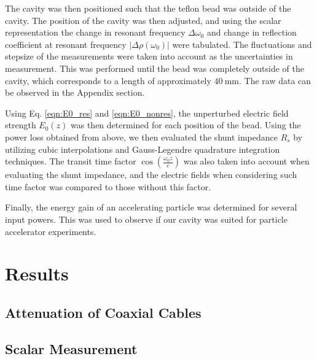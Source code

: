 \documentclass[a4paper]{article}
\numberwithin{equation}{section}
\begin{document}
The cavity was then positioned such that the teflon bead was outside of the
cavity. The position of the cavity was then adjusted, and using the scalar
representation the change in resonant frequency $\Delta\omega_0$ and change in
reflection coefficient at resonant frequency $|\Delta\rho(\omega_0)|$ were
tabulated. The fluctuations and stepsize of the measurements were taken into
account as the uncertainties in measurement. This was performed until the bead
was completely outside of the cavity, which corresponds to a length of
approximately $\SI{40}{\milli\metre}$. The raw data can be observed in the
Appendix section. \par 

Using Eq. \ref{eqn:E0_res} and \ref{eqn:E0_nonres}, the unperturbed electric
field strength $E_0(z)$ was then determined for each position of the bead. Using
the power loss obtained from above, we then evaluated the shunt impedance $R_s$ by
utilizing cubic interpolations and Gauss-Legendre quadrature integration
techniques. The transit time factor $\cos(\frac{\omega_0 z}{c})$ was also taken
into account when evaluating the shunt impedance, and the electric fields when
considering such time factor was compared to those without this factor. \par 

Finally, the energy gain of an accelerating particle was determined for several
input powers. This was used to observe if our cavity was suited for particle
accelerator experiments.



\section{Results}

\subsection{Attenuation of Coaxial Cables}


\subsection{Scalar Measurement}




\printbibliography
\end{document}
